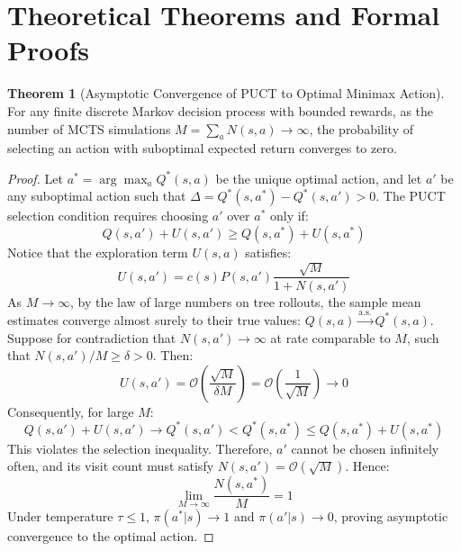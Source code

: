 \documentclass[11pt,a4paper]{article}
\theoremstyle{definition}
\newtheorem{theorem}{\textbf{Theorem}}[section]
\begin{document}
\section{Theoretical Theorems and Formal Proofs}

\begin{theorem}[Asymptotic Convergence of PUCT to Optimal Minimax Action]
For any finite discrete Markov decision process with bounded rewards, as the number of MCTS simulations $M = \sum_a N(s, a) \to \infty$, the probability of selecting an action with suboptimal expected return converges to zero.
\end{theorem}

\begin{proof}
Let $a^* = \arg\max_{a} Q^*(s, a)$ be the unique optimal action, and let $a'$ be any suboptimal action such that $\Delta = Q^*(s, a^*) - Q^*(s, a') > 0$.
The PUCT selection condition requires choosing $a'$ over $a^*$ only if:
{\boldmath
\begin{equation}
Q(s, a') + U(s, a') \ge Q(s, a^*) + U(s, a^*)
\end{equation}
}
Notice that the exploration term $U(s, a)$ satisfies:
{\boldmath
\begin{equation}
U(s, a') = c(s) P(s, a') \frac{\sqrt{M}}{1 + N(s, a')}
\end{equation}
}
As $M \to \infty$, by the law of large numbers on tree rollouts, the sample mean estimates converge almost surely to their true values: $Q(s, a) \xrightarrow{\text{a.s.}} Q^*(s, a)$.
Suppose for contradiction that $N(s, a') \to \infty$ at rate comparable to $M$, such that $N(s, a') / M \ge \delta > 0$.
Then:
{\boldmath
\begin{equation}
U(s, a') = \mathcal{O}\left( \frac{\sqrt{M}}{\delta M} \right) = \mathcal{O}\left( \frac{1}{\sqrt{M}} \right) \to 0
\end{equation}
}
Consequently, for large $M$:
{\boldmath
\begin{equation}
Q(s, a') + U(s, a') \to Q^*(s, a') < Q^*(s, a^*) \le Q(s, a^*) + U(s, a^*)
\end{equation}
}
This violates the selection inequality. Therefore, $a'$ cannot be chosen infinitely often, and its visit count must satisfy $N(s, a') = \mathcal{O}(\sqrt{M})$.
Hence:
{\boldmath
\begin{equation}
\lim_{M \to \infty} \frac{N(s, a^*)}{M} = 1
\end{equation}
}
Under temperature $\tau \le 1$, $\pi(a^* | s) \to 1$ and $\pi(a' | s) \to 0$, proving asymptotic convergence to the optimal action.
\end{proof}
\end{document}
